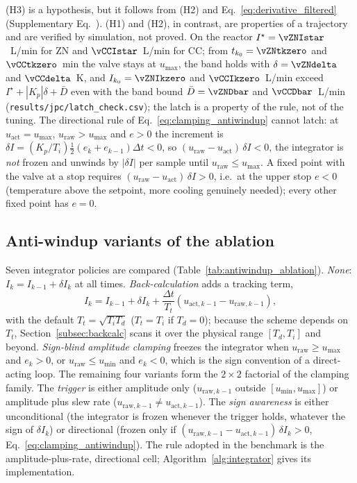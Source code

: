 (H3) is a hypothesis, but it follows from (H2) and Eq.~\eqref{eq:derivative_filtered} (Supplementary Eq.~). (H1) and (H2), in contrast, are properties of a trajectory and are verified by simulation, not proved. On the reactor $I^\star = \vZNIstar$~L/min for ZN and $\vCCIstar$~L/min for CC; from $t_{k_0} = \vZNtkzero$ and $\vCCtkzero$~min the valve stays at $u_{\max}$, the band holds with $\delta = \vZNdelta$ and $\vCCdelta$~K, and $I_{k_0} = \vZNIkzero$ and $\vCCIkzero$~L/min exceed $I^\star + |K_p|\delta + \bar D$ even with the band bound $\bar D = \vZNDbar$ and $\vCCDbar$~L/min (\texttt{results/jpc/latch\_check.csv}); the latch is a property of the rule, not of the tuning. The directional rule of Eq.~\eqref{eq:clamping_antiwindup} cannot latch: at $u_{\text{act}} = u_{\max}$, $u_{\text{raw}} > u_{\max}$ and $e > 0$ the increment is $\delta I = (K_p/T_i)\tfrac12(e_k + e_{k-1})\Delta t < 0$, so $(u_{\text{raw}} - u_{\text{act}})\,\delta I < 0$, the integrator is \emph{not} frozen and unwinds by $|\delta I|$ per sample until $u_{\text{raw}} \le u_{\max}$. A fixed point with the valve at a stop requires $(u_{\text{raw}} - u_{\text{act}})\,\delta I > 0$, i.e.\ at the upper stop $e < 0$ (temperature above the setpoint, more cooling genuinely needed); every other fixed point has $e = 0$.

\subsection{Anti-windup variants of the ablation}
\label{subsec:aw_variants}
Seven integrator policies are compared (Table~\ref{tab:antiwindup_ablation}). \emph{None}: $I_k = I_{k-1} + \delta I_k$ at all times. \emph{Back-calculation} \cite{astrom1989windup, galeani2009tutorial} adds a tracking term,
\begin{equation}
    I_k = I_{k-1} + \delta I_k + \frac{\Delta t}{T_t}\left(u_{\text{act},k-1} - u_{\text{raw},k-1}\right),
    \label{eq:back_calculation}
\end{equation}
with the default $T_t = \sqrt{T_i T_d}$ ($T_t = T_i$ if $T_d = 0$); because the scheme depends on $T_t$, Section~\ref{subsec:backcalc} scans it over the physical range $[T_d, T_i]$ and beyond. \emph{Sign-blind amplitude clamping} freezes the integrator when $u_{\text{raw}} \ge u_{\max}$ and $e_k > 0$, or $u_{\text{raw}} \le u_{\min}$ and $e_k < 0$, which is the sign convention of a direct-acting loop. The remaining four variants form the $2\times 2$ factorial of the clamping family. The \emph{trigger} is either amplitude only ($u_{\text{raw},k-1}$ outside $[u_{\min}, u_{\max}]$) or amplitude plus slew rate ($u_{\text{raw},k-1} \ne u_{\text{act},k-1}$). The \emph{sign awareness} is either unconditional (the integrator is frozen whenever the trigger holds, whatever the sign of $\delta I_k$) or directional (frozen only if $(u_{\text{raw},k-1} - u_{\text{act},k-1})\,\delta I_k > 0$, Eq.~\eqref{eq:clamping_antiwindup}). The rule adopted in the benchmark is the amplitude-plus-rate, directional cell; Algorithm~\ref{alg:integrator} gives its implementation.

